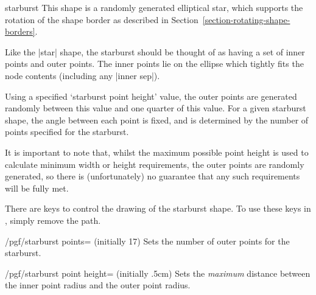 \begin{shape}{starburst}
    This shape is a randomly generated elliptical star, which supports the
    rotation of the shape border as described in
    Section~\ref{section-rotating-shape-borders}.
\begin{codeexample}[preamble={\usetikzlibrary{shapes.symbols}}]
\end{codeexample}
    Like the |star| shape, the starburst should be thought of as having a set
    of inner points and outer points. The inner points lie on the ellipse which
    tightly fits the node contents (including any |inner sep|).

    Using a specified `starburst point height' value, the outer points are
    generated randomly between this value and one quarter of this value. For a
    given starburst shape, the angle between each point is fixed, and is
    determined by the number of points specified for the starburst.

    It is important to note that, whilst the maximum possible point height is
    used to calculate minimum width or height requirements, the outer points
    are randomly generated, so there is (unfortunately) no guarantee that any
    such requirements will be fully met.
\begin{codeexample}[preamble={\usetikzlibrary{shapes.symbols}}]
\end{codeexample}

    There are \pgfname{} keys to control the drawing of the starburst shape. To
    use these keys in \tikzname, simply remove the  path.

    \begin{key}{/pgf/starburst points= (initially 17)}
        Sets the number of outer points for the starburst.
    \end{key}
    \begin{key}{/pgf/starburst point height= (initially .5cm)}
        Sets the \emph{maximum} distance between the inner point radius and the
        outer point radius.
    \end{key}


\end{shape}
